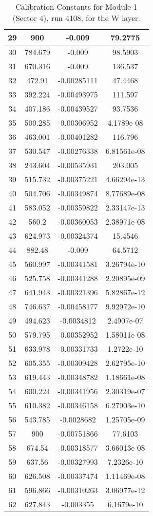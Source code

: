 \begin{table}[h]
{\begin{tabular}{|c|c|c|c|}
29	&	900	&	-0.009	&	79.2775	\\	\hline
30	&	784.679	&	-0.009	&	98.5903	\\	\hline
31	&	670.316	&	-0.009	&	136.537	\\	\hline
32	&	472.91	&	-0.00285111	&	47.4468	\\	\hline
33	&	392.224	&	-0.00493975	&	111.597	\\	\hline
34	&	407.186	&	-0.00439527	&	93.7536	\\	\hline
35	&	500.285	&	-0.00306952	&	4.1789e-08	\\	\hline
36	&	463.001	&	-0.00401282	&	116.796	\\	\hline
37	&	530.547	&	-0.00276338	&	6.81561e-08	\\	\hline
38	&	243.604	&	-0.00535931	&	203.005	\\	\hline
39	&	515.732	&	-0.00375221	&	4.66294e-13	\\	\hline
40	&	504.706	&	-0.00349874	&	8.77689e-08	\\	\hline
41	&	583.052	&	-0.00359822	&	2.33147e-13	\\	\hline
42	&	560.2	&	-0.00360053	&	2.38971e-08	\\	\hline
43	&	624.973	&	-0.00324374	&	15.4546	\\	\hline
44	&	882.48	&	-0.009	&	64.5712	\\	\hline
45	&	560.997	&	-0.00341581	&	3.26794e-10	\\	\hline
46	&	525.758	&	-0.00341288	&	2.20895e-09	\\	\hline
47	&	641.943	&	-0.00321396	&	5.82867e-12	\\	\hline
48	&	746.637	&	-0.00458177	&	9.92972e-10	\\	\hline
49	&	494.623	&	-0.0034812	&	2.4907e-07	\\	\hline
50	&	579.795	&	-0.00352952	&	1.58011e-08	\\	\hline
51	&	633.978	&	-0.00331733	&	1.2722e-10	\\	\hline
52	&	605.355	&	-0.00309428	&	2.62795e-10	\\	\hline
53	&	619.443	&	-0.00348782	&	1.18661e-08	\\	\hline
54	&	600.224	&	-0.00341956	&	2.30319e-07	\\	\hline
55	&	610.382	&	-0.00346158	&	6.27903e-10	\\	\hline
56	&	543.785	&	-0.0028682	&	1.25705e-09	\\	\hline
57	&	900	&	-0.00751866	&	77.6103	\\	\hline
58	&	674.54	&	-0.00318577	&	3.66013e-08	\\	\hline
59	&	637.56	&	-0.00327993	&	7.2326e-10	\\	\hline
60	&	626.508	&	-0.00337474	&	1.11469e-08	\\	\hline
61	&	596.866	&	-0.00310263	&	3.06977e-12	\\	\hline
62	&	627.843	&	-0.003355	&	6.1679e-10	\\	\hline
  \end{tabular}
        }
        \caption{Calibration Constants for Module 1 (Sector 4), run 4108, for the W layer.}
\end{table}

